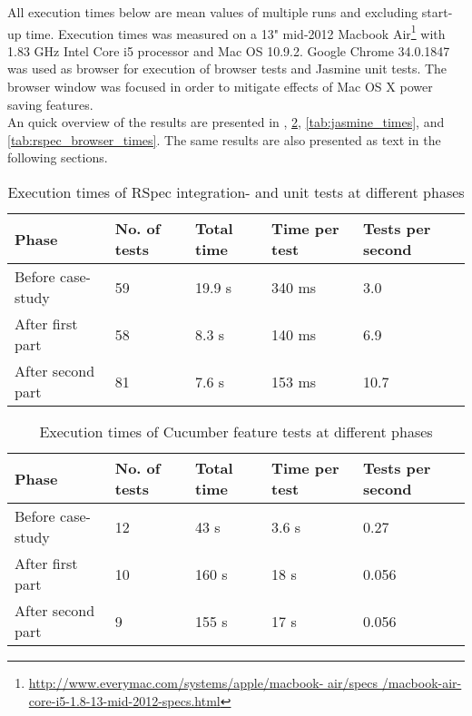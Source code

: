 \label{sec:results_time}

All execution times below are mean values of multiple runs and excluding
start-up time. Execution times was measured on a 13" mid-2012 Macbook
Air\footnote{\url{http://www.everymac.com/systems/apple/macbook-
air/specs /macbook-air-core-i5-1.8-13-mid-2012-specs.html}} with 1.83
GHz Intel Core i5 processor and Mac OS 10.9.2. Google Chrome 34.0.1847
was used as browser for execution of browser tests and Jasmine unit
tests. The browser window was focused in order to mitigate effects of
Mac OS X power saving features.\\

An quick overview of the results are presented in ,
\ref{tab:cucumber_times}, \ref{tab:jasmine_times}, and
\ref{tab:rspec_browser_times}. The same results are also presented as
text in the following sections.\\

\begin{table}[t]
    \centering
    \begin{tabular}{l l l l l}
        Phase & No. of tests & Total time & Time per test & Tests per second\\
        \hline
        Before case-study & 59 & 19.9 s& 340 ms & 3.0 \\
        After first part  & 58 & 8.3 s & 140 ms & 6.9 \\
        After second part & 81 & 7.6 s  & 153 ms & 10.7\\
    \end{tabular}
    \caption{ Execution times of RSpec integration- and unit tests at different phases }
    \label{tab:unit_times}
\end{table}


\begin{table}[t]
    \centering
    \begin{tabular}{l l l l l}
        Phase & No. of tests & Total time & Time per test & Tests per second \\
        \hline
        Before case-study & 12 & 43 s & 3.6 s & 0.27 \\
        After first part  & 10 & 160 s & 18 s & 0.056\\
        After second part & 9 &  155 s & 17 s & 0.056\\
    \end{tabular}
    \caption{ Execution times of Cucumber feature tests at different phases }
    \label{tab:cucumber_times}
\end{table}


